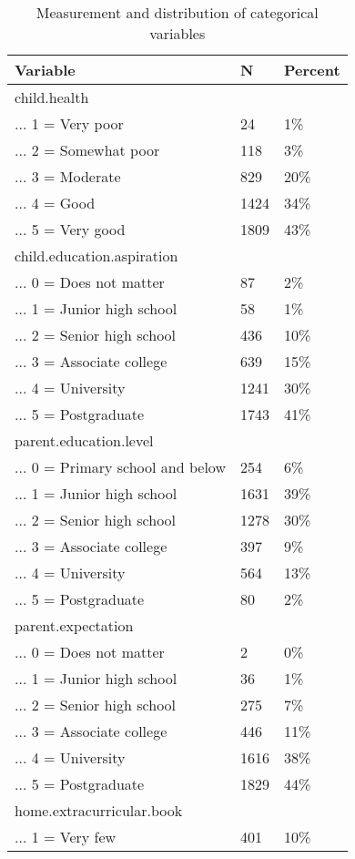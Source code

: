 \documentclass[
  man]{apa7}
\begin{document}
\begin{table}

\caption{\label{tab:tab-ctvar-msr}Measurement and distribution of categorical variables}
\centering
\begin{tabular}[t]{lll}
\toprule
Variable & N & Percent\\
\midrule
child.health &  & \\
... 1 = Very poor & 24 & 1\%\\
... 2 = Somewhat poor & 118 & 3\%\\
... 3 = Moderate & 829 & 20\%\\
... 4 = Good & 1424 & 34\%\\
\addlinespace
... 5 = Very good & 1809 & 43\%\\
child.education.aspiration &  & \\
... 0 = Does not matter & 87 & 2\%\\
... 1 = Junior high school & 58 & 1\%\\
... 2 = Senior high school & 436 & 10\%\\
\addlinespace
... 3 = Associate college & 639 & 15\%\\
... 4 = University & 1241 & 30\%\\
... 5 = Postgraduate & 1743 & 41\%\\
parent.education.level &  & \\
... 0 = Primary school and below & 254 & 6\%\\
\addlinespace
... 1 = Junior high school & 1631 & 39\%\\
... 2 = Senior high school & 1278 & 30\%\\
... 3 = Associate college & 397 & 9\%\\
... 4 = University & 564 & 13\%\\
... 5 = Postgraduate & 80 & 2\%\\
\addlinespace
parent.expectation &  & \\
... 0 = Does not matter & 2 & 0\%\\
... 1 = Junior high school & 36 & 1\%\\
... 2 = Senior high school & 275 & 7\%\\
... 3 = Associate college & 446 & 11\%\\
\addlinespace
... 4 = University & 1616 & 38\%\\
... 5 = Postgraduate & 1829 & 44\%\\
home.extracurricular.book &  & \\
... 1 = Very few & 401 & 10\%\\

\end{tabular}
\end{table}
\end{document}
